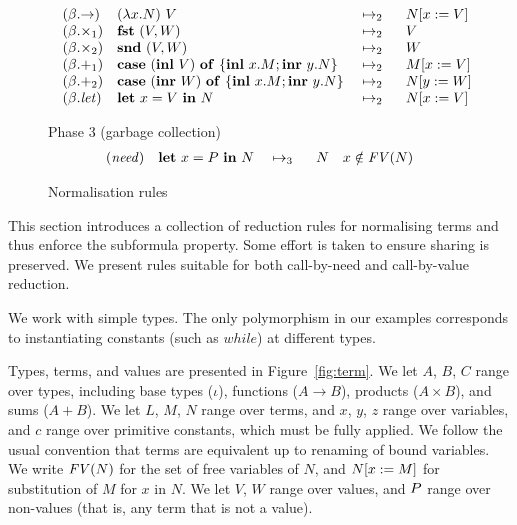 {\begin{figure*}[t]
\[\begin{array}[t]{@{\quad}llll@{}}
(\beta.{\rightarrow})
& \expapp{(\expabs{x}{A}{N})}{V}
& \ \rewrite{}{2}{}\ \
& \sbs{N}{x}{V} \\

(\beta.{\times_1})
& \expfst{\expprd{V}{W}}
& \ \rewrite{}{2}{}\ \
& V \\

(\beta.{\times_2})
& \expsnd{\expprd{V}{W}}
& \ \rewrite{}{2}{}\ \
& W \\

(\beta.{+_1})
& \expcas{(\explft{V}{B})}{x}{M}{y}{N}
& \ \rewrite{}{2}{}\ \
& \sbs{M}{x}{V} \\

(\beta.{+_2})
& \expcas{(\exprgt{A}{W})}{x}{M}{y}{N}
& \ \rewrite{}{2}{}\ \
& \sbs{N}{y}{W} \\

(\beta.{\txt{let}})
& \expshr{x}{V}{N}
& \ \rewrite{}{2}{}\ \
& \sbs{N}{x}{V} \\
\end{array}
\]

Phase 3 (garbage collection)
\[
\begin{array}[t]{@{}llll@{\quad}l@{}}

(\txt{need})
& \expshr{x}{\nv}{N}
& \ \rewrite{}{3}{}\ \
& N %
& \cnd{%
       x \notin \fv{N}}\\
\end{array}
\]
\caption{Normalisation rules}
\label{fig:norm}
\end{figure*}
}


\figterm
\fignf
\fignorm


This section introduces a collection of reduction rules for
normalising terms and thus enforce the subformula property. Some
effort is taken to ensure sharing is preserved. We present rules
suitable for both call-by-need and call-by-value reduction.

We work with simple types. The only polymorphism in our examples
corresponds to instantiating constants (such as $\mathit{while}$) at
different types.

Types, terms, and values are presented in Figure~\ref{fig:term}. We
let $A$, $B$, $C$ range over types, including base types ($\iota$),
functions ($A \to B$), products ($A \times B$), and sums ($A + B$).
We let $L$, $M$, $N$ range over terms, and $x$, $y$, $z$ range over
variables, and $c$ range over primitive constants, which must be fully
applied. We follow the usual convention that terms are equivalent up
to renaming of bound variables. We write $\text{\textit{FV}}(N)$ for the set of free
variables of $N$, and $N[x:=M]$ for substitution of $M$ for $x$
in $N$.
%
%
We let $V$, $W$ range over values, and $P$ range over non-values
(that is, any term that is not a value).

